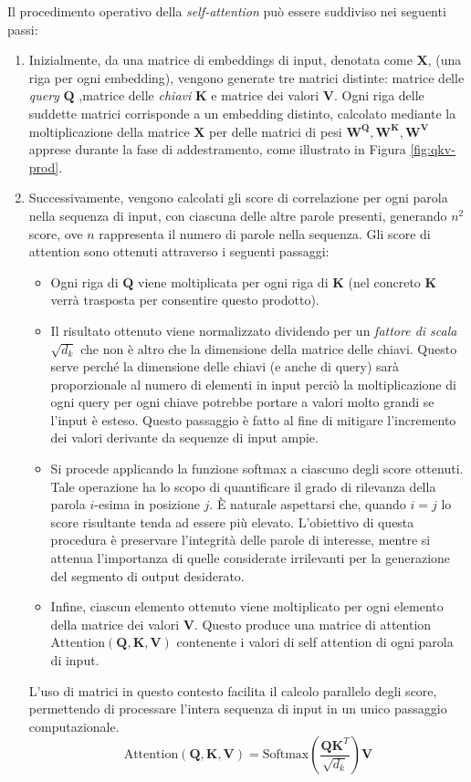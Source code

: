 \documentclass[12pt,a4paper,twoside,openright]{book}
\begin{document}
Il procedimento operativo della \emph{self-attention} può essere suddiviso nei seguenti passi:
\begin{enumerate}
    \item Inizialmente, da una matrice di embeddings di input, denotata come $\mathbf{X}$, (una riga per ogni embedding), vengono generate tre matrici distinte: matrice delle \emph{query} $\mathbf{Q}$ ,matrice delle \emph{chiavi} $\mathbf{K}$ e matrice dei valori $\mathbf{V}$. Ogni riga delle suddette matrici corrisponde a un embedding distinto, calcolato mediante la moltiplicazione della matrice $\mathbf{X}$ per delle matrici di pesi $\mathbf{W^Q},\mathbf{W^K},\mathbf{W^V}$ apprese durante la fase di addestramento, come illustrato in Figura \ref{fig:qkv-prod}.
    \item Successivamente, vengono calcolati gli score di correlazione per ogni parola nella sequenza di input, con ciascuna delle altre parole presenti, generando $n^2$ score, ove $n$ rappresenta il numero di parole nella sequenza. Gli score di attention sono ottenuti attraverso i seguenti passaggi:
    \begin{itemize}
        \item Ogni riga di $\mathbf{Q}$ viene moltiplicata per ogni riga di $\mathbf{K}$ (nel concreto $\mathbf{K}$ verrà trasposta per consentire questo prodotto).
        \item Il risultato ottenuto viene normalizzato dividendo per un \emph{fattore di scala} $\sqrt{d_k}$ che non è altro che la dimensione della matrice delle chiavi. Questo serve perché la dimensione delle chiavi (e anche di query) sarà proporzionale al numero di elementi in input perciò la moltiplicazione di ogni query per ogni chiave potrebbe portare a valori molto grandi se l'input è esteso. Questo passaggio è fatto al fine di mitigare l'incremento dei valori derivante da sequenze di input ampie. 
        \item Si procede applicando la funzione softmax a ciascuno degli score ottenuti. Tale operazione ha lo scopo di quantificare il grado di rilevanza della parola $i$-esima in posizione $j$. È naturale aspettarsi che, quando $i = j$ lo score risultante tenda ad essere più elevato. L'obiettivo di questa procedura è preservare l'integrità delle parole di interesse, mentre si attenua l'importanza di quelle considerate irrilevanti per la generazione del segmento di output desiderato.
        \item Infine, ciascun elemento ottenuto viene moltiplicato per ogni elemento della matrice dei valori $\mathbf{V}$. Questo produce una matrice di attention $\text{Attention}(\mathbf{Q,K,V})$ contenente i valori di self attention di ogni parola di input.
    \end{itemize}
    L'uso di matrici in questo contesto facilita il calcolo parallelo degli score, permettendo di processare l'intera sequenza di input in un unico passaggio computazionale.
    \begin{equation}
    \label{eq:attention}
        \text{Attention}(\mathbf{Q,K,V}) = \text{Softmax}\left( \frac{\mathbf{Q}\mathbf{K}^T}{\sqrt{d_k}} \right) \mathbf{V}
    \end{equation}


\end{enumerate}
\end{document}

